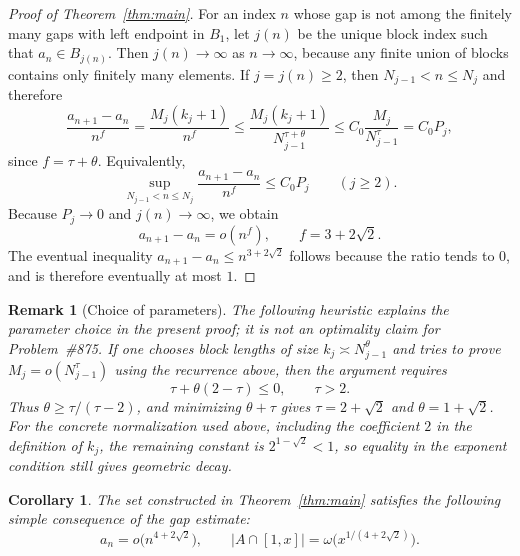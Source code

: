 \documentclass[11pt]{article}
\newtheorem{corollary}{Corollary}
\newtheorem{remark}{Remark}
\begin{document}
\begin{proof}[Proof of Theorem~\ref{thm:main}]
For an index $n$ whose gap is not among the finitely many gaps with left endpoint in $B_1$, let $j(n)$ be the unique block index such that $a_n\in B_{j(n)}$.  Then $j(n)\to\infty$ as $n\to\infty$, because any finite union of blocks contains only finitely many elements.  If $j=j(n)\ge2$, then $N_{j-1}<n\le N_j$ and therefore
\[
        \frac{a_{n+1}-a_n}{n^f}
        =\frac{M_j(k_j+1)}{n^f}
        \le
        \frac{M_j(k_j+1)}{N_{j-1}^{\tau+\theta}}
        \le C_0\frac{M_j}{N_{j-1}^{\tau}}
        =C_0P_j,
\]
since $f=\tau+\theta$.  Equivalently,
\[
        \sup_{N_{j-1}<n\le N_j}
        \frac{a_{n+1}-a_n}{n^f}
        \le C_0P_j
        \qquad (j\ge2).
\]
Because $P_j\to0$ and $j(n)\to\infty$, we obtain
\[
        a_{n+1}-a_n=o(n^f),
        \qquad
        f=3+2\sqrt2.
\]
The eventual inequality $a_{n+1}-a_n\le n^{3+2\sqrt2}$ follows because the ratio tends to $0$, and is therefore eventually at most $1$.
\end{proof}

\begin{remark}[Choice of parameters]\label{rem:parameters}
The following heuristic explains the parameter choice in the present proof; it is not an optimality claim for Problem~\#875.  If one chooses block lengths of size $k_j\asymp N_{j-1}^{\theta}$ and tries to prove $M_j=o(N_{j-1}^{\tau})$ using the recurrence above, then the argument requires
\[
        \tau+\theta(2-\tau)\le0,
        \qquad \tau>2.
\]
Thus $\theta\ge \tau/(\tau-2)$, and minimizing $\theta+\tau$ gives $\tau=2+\sqrt2$ and $\theta=1+\sqrt2$.  For the concrete normalization used above, including the coefficient $2$ in the definition of $k_j$, the remaining constant is $2^{1-\sqrt2}<1$, so equality in the exponent condition still gives geometric decay.
\end{remark}

\begin{corollary}\label{cor:growth}
The set constructed in Theorem~\ref{thm:main} satisfies the following simple consequence of the gap estimate:
\[
        a_n=o\bigl(n^{4+2\sqrt2}\bigr),
        \qquad
        |A\cap[1,x]|=\omega\bigl(x^{1/(4+2\sqrt2)}\bigr).
\]
\end{corollary}
\end{document}
